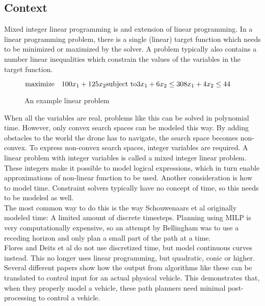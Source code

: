 \subsection{Context}
\label{subsec:previous}
Mixed integer linear programming is and extension of linear programming. In a linear programming problem, there is a single (linear) target function which needs to be minimized or maximized by the solver. A problem typically also contains a number linear inequalities which constrain the values of the variables in the target function.
\begin{figure}[h]
\begin{math}
\text{maximize} \quad 100 x_1 + 125 x_2 \\
\text{subject to} \\
3 x_1 + 6 x_2 \leq 30 \\
8 x_1 + 4 x_2 \leq 44
\end{math}
\caption{An example linear problem}
\end{figure}
When all the variables are real, problems like this can be solved in polynomial time. However, only convex search spaces can be modeled this way. By adding obstacles to the world the drone has to navigate, the search space becomes non-convex. To express non-convex search spaces, integer variables are required\cite{Schouwenaars2001}. A linear problem with integer variables is called a mixed integer linear problem. These integers make it possible to model logical expressions, which in turn enable approximations of non-linear function to be used. Another consideration is how to model time. Constraint solvers typically have no concept of time, so this needs to be modeled as well. \\
The most common way to do this is the way Schouwenaars et al\cite{Schouwenaars2001} originally modeled time: A limited amount of discrete timesteps. Planning using MILP is very computationally expensive, so an attempt by Bellingham\cite{Bellingham2002} was to use a receding horizon and only plan a small part of the path at a time. \\ 
Flores\cite{Flores2007} and Deits et al\cite{Deits2015} do not use discretized time, but model continuous curves instead. This no longer uses linear programming, but quadratic, conic or higher.
\\
Several different papers\cite{Fliess1995a, Hao2005, Cowling2007, Mellinger2011} show how the output from algorithms like these can be translated to control input for an actual physical vehicle. This demonstrates that, when they properly model a vehicle, these path planners need minimal post-processing to control a vehicle.
